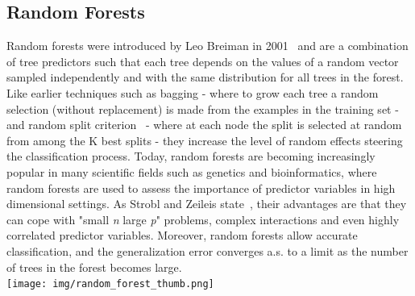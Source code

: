 \subsection{Random Forests}\label{randomforest}
Random forests were introduced by Leo Breiman in 2001~\cite{Breiman01randomforests} and are a combination of tree predictors such that each tree depends on the values of a random vector sampled independently and with the same distribution for all trees in the forest. Like earlier techniques such as bagging - where to grow each tree a random selection (without replacement) is made from the examples in the training set - and random split criterion~\cite{Dietterich00anexperimental} - where at each node the split is selected at random from among the K best splits - they increase the level of random effects steering the classification process.  Today, random forests are becoming increasingly popular in many scientific fields such as genetics and bioinformatics, where random forests are used to assess the importance of predictor variables in high dimensional settings. As Strobl and Zeileis state~\cite{strobl08why}, their advantages are that they can cope with "small \textit{n} large \textit{p}" problems, complex interactions and even highly correlated predictor variables. Moreover, random forests allow accurate classification, and the generalization error converges a.s. to a limit as the number of trees in the forest becomes large.
\vspace{1cm}\\
\texttt{[image: img/random\_forest\_thumb.png]}


\newpage
